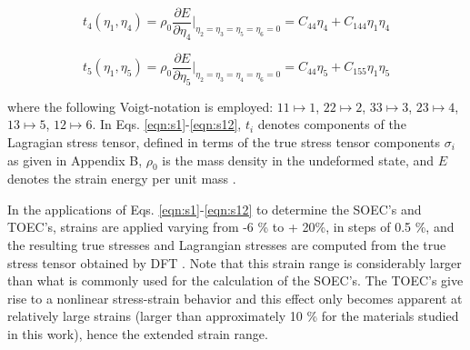 \documentclass[showpacs,aps,floatfix,prb,reprint,superscriptaddress]{revtex4-1}
\begin{document}
\begin{equation}
\label{eqn:s11} 
t_{4} \left(\eta_{1}, \eta_{4}\right) = \rho_{0} \frac{\partial E}{\partial \eta_{4}}\Bigr|_{\eta_2=\eta_3=\eta_5=\eta_6=0} = C_{44}\eta_{4} + C_{144}\eta_{1}\eta_{4}
\end{equation}

\begin{equation}
\label{eqn:s12} 
t_{5} \left(\eta_{1}, \eta_{5}\right) = \rho_{0} \frac{\partial E}{\partial \eta_{5}}\Bigr|_{\eta_2=\eta_3=\eta_4=\eta_6=0} = C_{44}\eta_{5} + C_{155}\eta_{1}\eta_{5}
\end{equation}

\twocolumngrid


where the following Voigt-notation is employed: $11 \mapsto 1$, $22 \mapsto 2$, $33 \mapsto 3$, $23 \mapsto 4$, $13 \mapsto 5$, $12 \mapsto 6$.  In Eqs. \ref{eqn:s1}-\ref{eqn:s12}, $t_{i}$ denotes components of the Lagragian stress tensor, defined in terms of the true stress tensor components $\sigma_{i}$ as given in Appendix B, $\rho_0$ is the mass density in the undeformed state, and $E$ denotes the strain energy per unit mass \cite{lopuszynski2007ab}.

In the applications of Eqs. \ref{eqn:s1}-\ref{eqn:s12} to determine the SOEC's and TOEC's, strains are applied varying from -6 \% to + 20\%, in steps of 0.5 \%, and the resulting true stresses and Lagrangian stresses are computed from the true stress tensor obtained by DFT \cite{lopuszynski2007ab}.
Note that this strain range is considerably larger than what is commonly used for the calculation of the SOEC's. The TOEC's give rise to a nonlinear stress-strain behavior and this effect only becomes apparent at relatively large strains (larger than approximately 10 \% for the materials studied in this work), hence the extended strain range.
\end{document}
